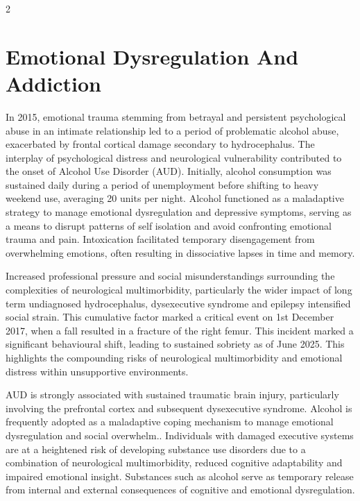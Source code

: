 \documentclass{article}
\begin{document}
\begin{multicols}{2}
\section*{Emotional Dysregulation And Addiction}
In 2015, emotional trauma stemming from betrayal and persistent psychological abuse in an intimate relationship led to a period of problematic alcohol abuse, exacerbated by frontal cortical damage secondary to hydrocephalus. The interplay of psychological distress and neurological vulnerability contributed to the onset of Alcohol Use Disorder (AUD).\cite{sinha2008,goldstein2011} Initially, alcohol consumption was sustained daily during a period of unemployment before shifting to heavy weekend use, averaging 20 units per night. Alcohol functioned as a maladaptive strategy to manage emotional dysregulation and depressive symptoms, serving as a means to disrupt patterns of self isolation and avoid confronting emotional trauma and pain. Intoxication facilitated temporary disengagement from overwhelming emotions, often resulting in dissociative lapses in time and memory.\cite{lanius2012,khoury2010}

Increased professional pressure and social misunderstandings surrounding the complexities of neurological multimorbidity, particularly the wider impact of long term undiagnosed hydrocephalus, dysexecutive syndrome and epilepsy intensified social strain. This cumulative factor marked a critical event on 1st December 2017, when a fall resulted in a fracture of the right femur. This incident marked a significant behavioural shift, leading to sustained sobriety as of June 2025. This highlights the compounding risks of neurological multimorbidity and emotional distress within unsupportive environments.

AUD is strongly associated with sustained traumatic brain injury, particularly involving the prefrontal cortex and subsequent dysexecutive syndrome. Alcohol is frequently adopted as a maladaptive coping mechanism to manage emotional dysregulation and social overwhelm.\cite{corrigan2000,corrigan2015,perry2022}. Individuals with damaged executive systems are at a heightened risk of developing substance use disorders due to a combination of neurological multimorbidity, reduced cognitive adaptability and impaired emotional insight. Substances such as alcohol serve as temporary release from internal and external consequences of cognitive and emotional dysregulation.


\end{multicols}
\end{document}
